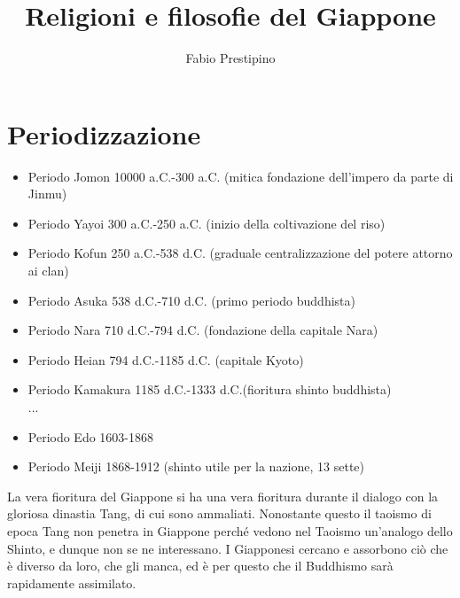 \documentclass[10pt,a4paper]{report}
\author{Fabio Prestipino}
\title{Religioni e filosofie del Giappone}
\begin{document}
	\maketitle
\section*{Periodizzazione}
\begin{itemize}
	\item Periodo Jomon 10000 a.C.-300 a.C. (mitica fondazione dell'impero da parte di Jinmu)
	\item Periodo Yayoi 300 a.C.-250 a.C. (inizio della coltivazione del riso)
	\item Periodo Kofun 250 a.C.-538 d.C. (graduale centralizzazione del potere attorno ai clan)
	\item Periodo Asuka 538 d.C.-710 d.C. (primo periodo buddhista)
	\item Periodo Nara 710 d.C.-794 d.C. (fondazione della capitale Nara)
	\item Periodo Heian 794 d.C.-1185 d.C. (capitale Kyoto)
	\item Periodo Kamakura 1185 d.C.-1333 d.C.(fioritura shinto buddhista)\\
	...\\
	\item Periodo Edo 1603-1868
	\item Periodo Meiji 1868-1912 (shinto utile per la nazione, 13 sette)
\end{itemize}
La vera fioritura del Giappone si ha una vera fioritura durante il dialogo con la gloriosa dinastia Tang, di cui sono ammaliati. Nonostante questo il taoismo di epoca Tang non penetra in Giappone perché vedono nel Taoismo un'analogo dello Shinto, e dunque non se ne interessano. I Giapponesi cercano e assorbono ciò che è diverso da loro, che gli manca, ed è per questo che il Buddhismo sarà rapidamente assimilato.
\end{document}
